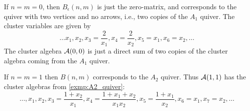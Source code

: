 \begin{example}
	If $n=m=0$, then $B_{\epsilon}(n,m)$ is just the zero-matrix, and corresponds to the
	quiver with two vertices and no arrows, i.e., two copies of the $A_1$ quiver. The
	cluster variables are given by
	\begin{equation*}
		\dots x_1, x_2, x_3 =\frac{2}{x_1}, x_4=\frac{2}{x_2}, x_5=x_1, x_6=x_2, \dots
	\end{equation*}
	The cluster algebra $\mathcal{A}(0,0)$ is just a direct sum of two copies of the cluster
	algebra coming from the $A_1$ quiver.

	If $n=m=1$ then $B(n,m)$ corresponds to the $A_2$ quiver. Thus $\mathcal{A}(1,1)$ has the
	cluster algebras from \cref{exmp:A2_quiver}:
	\begin{equation*}
		\dots, x_1, x_2, x_3=\frac{1 + x_2}{x_1}, x_4=\frac{1 + x_1 + x_2}{x_1x_2}, x_5=\frac{1 + x_1}{x_2}, x_6=x_1, x_7=x_2, \dots
	\end{equation*}


\end{example}
